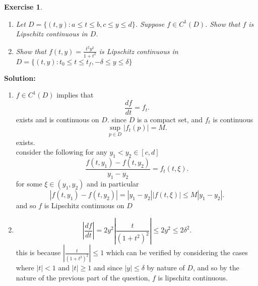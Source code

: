 \documentclass[a4paper,12pt]{scrartcl} %
\newenvironment{solution}
  {\par\color{answercolor}\textbf{Solution:}\ }
  {\par}
\newcounter{customcounter}
\theoremstyle{darktheorem}
\newtheorem{exercise}[customcounter]{Exercise}
\begin{document}
\begin{exercise}
    \leavevmode
    \begin{enumerate}[label = (\alph*)]
        \item Let $D = \{(t,y) : a \le t \le b,c \le y \le d\}$. Suppose $f \in C^{1}(D)$.
            Show that $f$ is Lipschitz continuous in $D$.
        \item Show that $f(t,y) = \frac{t^2y^2}{1+t^2}$ is Lipschitz continuous in $D = \{(t,y): t_0 \le t \le t_f, -\delta \le y \le \delta\}$
    \end{enumerate}
\end{exercise}
\begin{solution}
    \begin{enumerate}[label = (\alph*)]
        \item  $f \in C^{1}(D)$ implies that
            \[
            \frac{df}{dt} = f_t
        .\] exists and is continuous on $D$.
        since $D$ is a compact set, and $f_t$ is continuous
        \[
            \sup_{p \in D}|f_t(p)| = M
        .\] 
        exists.\\
        consider the following for any $y_1 < y_2 \in [c,d]$
            \[
                \frac{f(t,y_1) - f(t,y_2)}{y_1-y_2} = f_t(t,\xi)
            .\] 
            for some $\xi \in (y_1,y_2)$ and in particular
            \[
            |f(t,y_1) - f(t,y_2)| = |y_1-y_2||f(t,\xi)| \le M|y_1-y_2|
            .\] 
            and so $f$ is Lipschitz continuous on $D$
        \item 
            \[
            |\frac{df}{dt}| = 2y^2|\frac{t}{(1+t^2)^2}| \le 2y^2 \le 2\delta^2
            .\] 
            this is because $|\frac{t}{(1+t^2)^2}| \le 1$ which can be verified by considering the cases where $|t| < 1$
            and $|t| \ge 1$ and since  $|y| \le \delta$ by nature of $D$, and so by the nature
            of the previous part of the question, $f$ is lipschitz continuous.
    \end{enumerate}
\end{solution}
\end{document}
